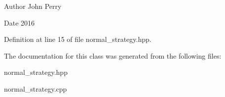 \begin{DoxyAuthor}{Author}
John Perry 
\end{DoxyAuthor}
\begin{DoxyDate}{Date}
2016 
\end{DoxyDate}


Definition at line 15 of file normal\+\_\+strategy.\+hpp.



The documentation for this class was generated from the following files\+:\begin{DoxyCompactItemize}
\item 
normal\+\_\+strategy.\+hpp\item 
normal\+\_\+strategy.\+cpp\end{DoxyCompactItemize}
